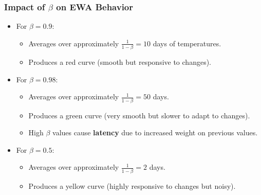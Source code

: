 \documentclass[letterpaper,12pt,notitlepage,twoside]{report}
\begin{document}
\subsubsection{Impact of \(\beta\) on EWA Behavior}
\begin{itemize}
    \item For \( \beta = 0.9 \):
    \begin{itemize}
        \item Averages over approximately \( \frac{1}{1 - \beta} = 10 \) days of temperatures.
        \item Produces a red curve (smooth but responsive to changes).
    \end{itemize}
    \item For \( \beta = 0.98 \):
    \begin{itemize}
        \item Averages over approximately \( \frac{1}{1 - \beta} = 50 \) days.
        \item Produces a green curve (very smooth but slower to adapt to changes).
        \item High \( \beta \) values cause \textbf{latency} due to increased weight on previous values.
    \end{itemize}
    \item For \( \beta = 0.5 \):
    \begin{itemize}
        \item Averages over approximately \( \frac{1}{1 - \beta} = 2 \) days.
        \item Produces a yellow curve (highly responsive to changes but noisy).
    \end{itemize}
\end{itemize}
\end{document}
